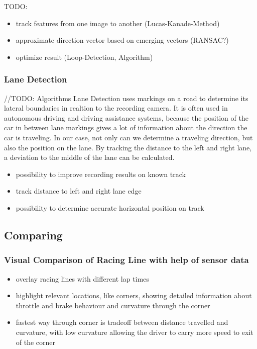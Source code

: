 TODO:
\begin{itemize}
  \item track features from one image to another (Lucas-Kanade-Method)
  \item approximate direction vector based on emerging vectors (RANSAC?)
  \item optimize result (Loop-Detection, Algorithm)
\end{itemize}

\subsubsection{Lane Detection}
//TODO: Algorithms
Lane Detection uses markings on a road to determine its lateral boundaries in realtion to the recording camera. It is often used in autonomous driving and driving assistance systems, because the position of the car in between lane markings gives a lot of information about the direction the car is traveling. 
In our case, not only can we determine a traveling direction, but also the position on the lane.
By tracking the distance to the left and right lane, a deviation to the middle of the lane can be calculated. 
\begin{itemize}
  \item possibility to improve recording results on known track
  \item track distance to left and right lane edge
  \item possibility to determine accurate horizontal position on track
\end{itemize}

\subsection{Comparing}
\subsubsection{Visual Comparison of Racing Line with help of sensor data}
\begin{itemize}
  \item overlay racing lines with different lap times
  \item highlight relevant locations, like corners, showing detailed information about throttle and brake behaviour and curvature through the corner
  \item fastest way through corner is tradeoff between distance travelled and curvature, with low curvature allowing the driver to carry more speed to exit of the corner
\end{itemize}


